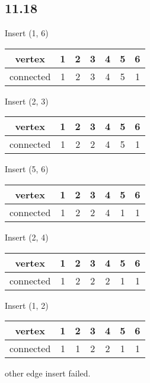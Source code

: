 \documentclass[12pt]{ctexart}
\begin{document}
    \subsection*{11.18}
    \begin{table}[h]
        Insert (1, 6)
        \begin{tabular}{|c|c|c|c|c|c|c|}
            \hline
            vertex & 1 & 2 & 3 & 4 & 5 & 6 \\ 
            \hline
            connected & 1 & 2 & 3 & 4 & 5 & 1 \\
            \hline
        \end{tabular}
    \end{table}
    \begin{table}[h]
        Insert (2, 3)
        \begin{tabular}{|c|c|c|c|c|c|c|}
            \hline
            vertex & 1 & 2 & 3 & 4 & 5 & 6 \\ 
            \hline
            connected & 1 & 2 & 2 & 4 & 5 & 1 \\
            \hline
        \end{tabular}
    \end{table}
    \begin{table}[h]
        Insert (5, 6)
        \begin{tabular}{|c|c|c|c|c|c|c|}
            \hline
            vertex & 1 & 2 & 3 & 4 & 5 & 6 \\ 
            \hline
            connected & 1 & 2 & 2 & 4 & 1 & 1 \\
            \hline
        \end{tabular}
    \end{table}
    \newpage
    \begin{table}[h]
        Insert (2, 4)
        \begin{tabular}{|c|c|c|c|c|c|c|}
            \hline
            vertex & 1 & 2 & 3 & 4 & 5 & 6 \\ 
            \hline
            connected & 1 & 2 & 2 & 2 & 1 & 1 \\
            \hline
        \end{tabular}
    \end{table}
    \begin{table}[h]
        Insert (1, 2)
        \begin{tabular}{|c|c|c|c|c|c|c|}
            \hline
            vertex & 1 & 2 & 3 & 4 & 5 & 6 \\ 
            \hline
            connected & 1 & 1 & 2 & 2 & 1 & 1 \\
            \hline
        \end{tabular}
    \end{table}
    other edge insert failed.
\end{document}

